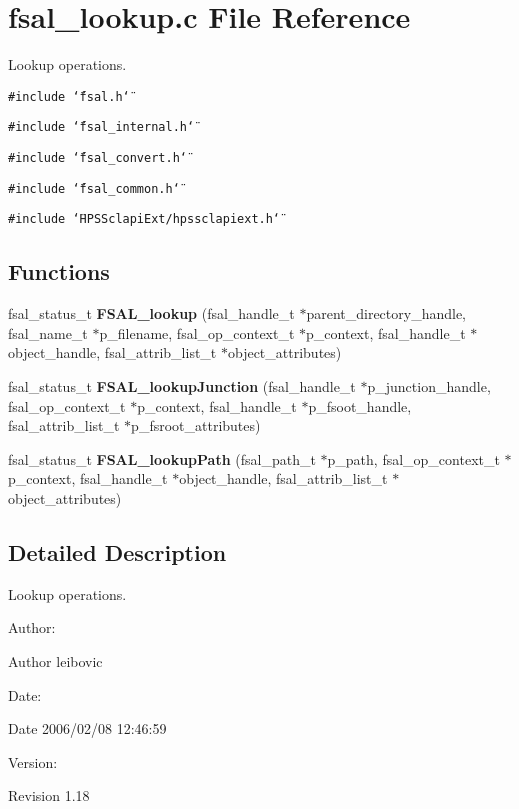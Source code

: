 \section{fsal\_\-lookup.c File Reference}
\label{fsal__lookup_8c}
Lookup operations. 

{\tt \#include \char`\"{}fsal.h\char`\"{}}\par
{\tt \#include \char`\"{}fsal\_\-internal.h\char`\"{}}\par
{\tt \#include \char`\"{}fsal\_\-convert.h\char`\"{}}\par
{\tt \#include \char`\"{}fsal\_\-common.h\char`\"{}}\par
{\tt \#include \char`\"{}HPSSclapi\-Ext/hpssclapiext.h\char`\"{}}\par
\subsection*{Functions}
\begin{CompactItemize}
\item 
fsal\_\-status\_\-t {\bf FSAL\_\-lookup} (fsal\_\-handle\_\-t $\ast$parent\_\-directory\_\-handle, fsal\_\-name\_\-t $\ast$p\_\-filename, fsal\_\-op\_\-context\_\-t $\ast$p\_\-context, fsal\_\-handle\_\-t $\ast$object\_\-handle, fsal\_\-attrib\_\-list\_\-t $\ast$object\_\-attributes)
\item 
fsal\_\-status\_\-t {\bf FSAL\_\-lookup\-Junction} (fsal\_\-handle\_\-t $\ast$p\_\-junction\_\-handle, fsal\_\-op\_\-context\_\-t $\ast$p\_\-context, fsal\_\-handle\_\-t $\ast$p\_\-fsoot\_\-handle, fsal\_\-attrib\_\-list\_\-t $\ast$p\_\-fsroot\_\-attributes)
\item 
fsal\_\-status\_\-t {\bf FSAL\_\-lookup\-Path} (fsal\_\-path\_\-t $\ast$p\_\-path, fsal\_\-op\_\-context\_\-t $\ast$p\_\-context, fsal\_\-handle\_\-t $\ast$object\_\-handle, fsal\_\-attrib\_\-list\_\-t $\ast$object\_\-attributes)
\end{CompactItemize}


\subsection{Detailed Description}
Lookup operations. 

\begin{Desc}
\item[Author:]\begin{Desc}
\item[Author]leibovic \end{Desc}
\end{Desc}
\begin{Desc}
\item[Date:]\begin{Desc}
\item[Date]2006/02/08 12:46:59 \end{Desc}
\end{Desc}
\begin{Desc}
\item[Version:]\begin{Desc}
\item[Revision]1.18 \end{Desc}
\end{Desc}


